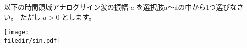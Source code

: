 以下の時間領域アナログサイン波の振幅 $a$ を選択肢a〜dの中から1つ選びなさい。
ただし $a>0$ とします。

\centering\texttt{[image: \\filedir/sin.pdf]}
